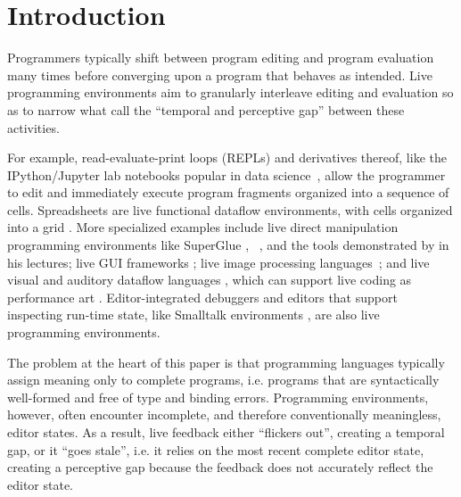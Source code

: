 \ifarxiv \clearpage \fi
\newcommand{\introSec}{Introduction}
\section{\introSec} 
\label{sec:intro}


Programmers typically shift between program editing and program evaluation many times before converging upon a program that behaves as intended. 
Live programming environments aim to granularly interleave editing and evaluation so as to   
narrow what \citet{burckhardt2013s} call the ``temporal and perceptive gap'' between these activities.

For example, read-evaluate-print loops (REPLs) and derivatives thereof, like the IPython/Jupyter lab notebooks popular in data science~\cite{PER-GRA:2007}, allow the programmer to edit and immediately execute program fragments organized into a sequence of cells. 
Spreadsheets are live functional dataflow environments, with cells organized into a grid \cite{DBLP:journals/jfp/Wakeling07}. 
More specialized examples include live direct manipulation programming environments like SuperGlue
\cite{McDirmid:2007}, \sns{}~\cite{sns-pldi,sns-uist}, and the tools
demonstrated by \citet{victor2012inventing} in his lectures;
%
live GUI frameworks \cite{burckhardt2013s};
%
live image processing languages~\cite{DBLP:journals/vlc/Tanimoto90};
%
and live visual and auditory dataflow languages \cite{DBLP:conf/vl/BurnettAW98}, which can support live coding as performance art \cite{DBLP:journals/programming/ReinRLHP19}.
Editor-integrated debuggers \cite{mccauley2008debugging} and editors that support inspecting run-time state, like Smalltalk environments \cite{Goldberg:1983cn}, are also live programming environments. 

%
The problem at the heart of this paper is that
programming languages typically assign meaning only to {complete programs}, i.e. programs that are syntactically well-formed and free of type and binding errors. Programming environments, however, often encounter incomplete, and therefore conventionally meaningless, editor states. As a result, live feedback either ``flickers out'', creating a temporal gap, or it ``goes stale'', i.e. it relies on the most recent complete editor state, creating a perceptive gap because the feedback does not accurately reflect the editor state.

